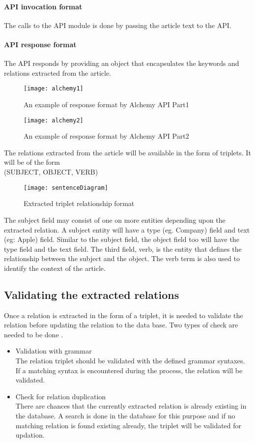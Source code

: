 \paragraph*{API invocation format}
\hfill
\par The calls to the API module is done by passing the article text to the API.
\paragraph*{API response format}
\hfill \break
The API responds by providing an object that encapsulates the keywords and relations 	extracted from the article.
\begin{figure}[h]
	\texttt{[image: alchemy1]}
	\centering
	\caption{An example of response format by Alchemy API Part1}
\end{figure}
\begin{figure}[h]
	\texttt{[image: alchemy2]}
	\centering
	\caption{An example of response format by Alchemy API Part2}
\end{figure}
\par 
The relations extracted from the article will be available in the form of triplets. It will be 	of the form \\(SUBJECT, OBJECT, VERB)
\begin{figure}[h]
	\texttt{[image: sentenceDiagram]}
	\centering
	\caption{Extracted triplet relationship format}
\end{figure}
\par The subject field may consist of one on more entities depending upon the extracted relation. A subject entity will have a type (eg. Company) field and text (eg: Apple) field. Similar to the subject field, the object field too will have the type field and the text field. The third field, verb, is the entity that defines the relationship between the subject and the object. The verb term is also used to identify the context of the article.

\subsection{Validating the extracted relations}
\par Once a relation is extracted in the form of a triplet, it is needed to validate the relation before updating the relation to the data base. Two types of check are needed to be done 
. 
\begin{itemize}
\item Validation with grammar
\\ The relation triplet should be validated with the defined grammar syntaxes. If a matching syntax is encountered during the process, the relation will be validated.
\item Check for relation duplication
\\ There are chances that the currently extracted relation is already existing in the database. A search is done in the database for this purpose and if no matching relation is found existing already, the triplet will be validated for updation. 
\end{itemize}


